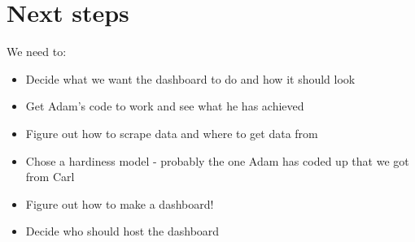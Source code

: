 \documentclass[11pt,letter]{article}
\begin{document}
\section{Next steps}

We need to:
\begin{itemize}
	\item Decide what we want the dashboard to do and how it should look
	\item Get Adam's code to work and see what he has achieved 
	\item Figure out how to scrape data and where to get data from
	\item Chose a hardiness model - probably the one Adam has coded up that we got from Carl
	\item Figure out how to make a dashboard!
	\item Decide who should host the dashboard 
\end{itemize}
\end{document}

